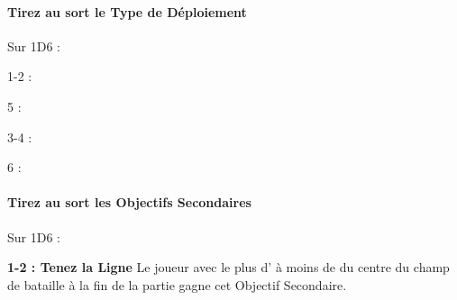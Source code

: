 {\begin{minipage}[t]{.35\linewidth}
\end{minipage}\hfill\begin{minipage}[t]{.62\linewidth}

\paragraph{Tirez au sort le Type de Déploiement}

Sur 1D6 :

\begin{minipage}[t]{0.48\textwidth}

\begin{center}
1-2 : 

\def\svgwidth{\textwidth}

\end{center}

\begin{center}
5 : 

\def\svgwidth{\textwidth}

\end{center}

\end{minipage}\hfill\begin{minipage}[t]{0.48\textwidth}

\begin{center}
3-4 : 

\def\svgwidth{\textwidth}

\end{center}

\begin{center}
6 : 

\def\svgwidth{\textwidth}

\end{center}

\end{minipage}
\end{minipage}

\vspace*{-10pt}
\paragraph{Tirez au sort les Objectifs Secondaires}

\vspace*{-5pt}
Sur 1D6 :

\textbf{1-2 : Tenez la Ligne}\newline
Le joueur avec le plus d'\scoringunits{} à moins de  du centre du champ de bataille à la fin de la partie gagne cet Objectif Secondaire.

}
